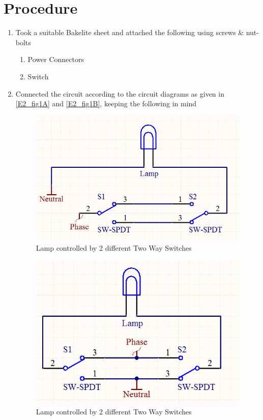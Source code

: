 \section{Procedure}
	\begin{enumerate}
		\item Took a suitable Bakelite sheet and attached the following using screws \& nut-bolts
			\begin{enumerate}
				\item Power Connectors
				\item Switch
			\end{enumerate} 
		\item Connected the circuit according to the circuit diagrams as given in \autoref{E2_fig1A} and \autoref{E2_fig1B}, keeping the following in mind
		\begin{figure}[bth]
			\begin{center}
				\includegraphics[width=.8\linewidth]{gfx/circuit2_A}
			\end{center}
		\caption[Lamp - 2 Two Way Switch - Method 1]{Lamp controlled by 2 different Two Way Switches}\label{E2_fig1A}
		\end{figure}

		\begin{figure}[bth]
			\begin{center}
				\includegraphics[width=.8\linewidth]{gfx/circuit2_B}
			\end{center}
		\caption[Lamp - 2 Two Way Switch - Method 2]{Lamp controlled by 2 different Two Way Switches}\label{E2_fig1B}
		\end{figure}


\end{enumerate}
